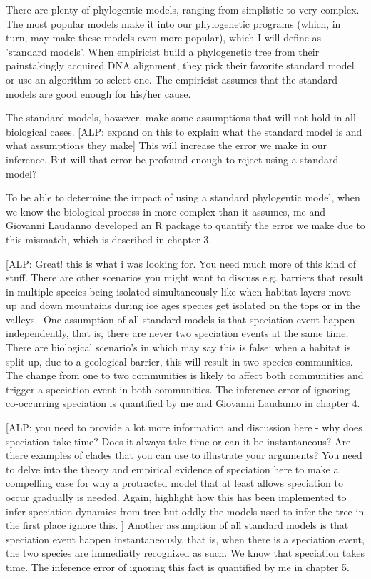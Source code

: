 There are plenty of phylogentic models, ranging from simplistic to
very complex. The most popular models make it into our
phylogenetic programs (which, in turn, may make these models even
more popular), which I will define as 'standard models'.
When empiricist build a phylogenetic tree from their
painstakingly acquired DNA alignment, they pick their favorite standard
model or use an algorithm to select one. The empiricist assumes that the
standard models are good enough for his/her cause.

The standard models, however, make some assumptions that will not hold
in all biological cases. 
[ALP: expand on this to explain what the standard model is and what assumptions they make] This will increase the error we make in
our inference. But will that error be profound enough to reject using
a standard model? 

To be able to determine the impact of using a standard phylogentic
model, when we know the biological process in more complex than it
assumes, me and Giovanni Laudanno developed an R package 
to quantify the error we make due to this mismatch, which is described
in chapter 3.

[ALP: Great! this is what i was looking for. You need much more of this kind of stuff. There are other scenarios you might want to discuss e.g. barriers that result in multiple species being isolated simultaneously like when habitat layers move up and down mountains during ice ages species get isolated on the tops or in the valleys.]
One assumption of all standard models is that speciation event happen
independently, that is, there are never two speciation events at the same time. 
There are biological scenario's in which may say
this is false: when a habitat is split up, 
due to a geological barrier, this will result in two 
species communities. The change from one to two communities is likely
to affect both communities and trigger a speciation event in both
communities. The inference error of ignoring co-occurring speciation is quantified by
me and Giovanni Laudanno in chapter 4.

[ALP: you need to provide a lot more information and discussion here - why does speciation take time? Does it always take time or can it be instantaneous? Are there examples of clades that you can use to illustrate your arguments? You need to delve  into the theory and empirical evidence of speciation here to make a compelling case for why a protracted model that at least allows speciation to occur gradually is needed. Again, highlight how this has been implemented to infer speciation dynamics from tree but oddly the models used to infer the tree in the first place ignore this. ]
Another assumption of all standard models is that speciation event happen
instantaneously, that is, when there is a speciation event, the two species
are immediatly recognized as such. We know that speciation takes
time. 
The inference error of ignoring this fact is quantified by
me in chapter 5.

